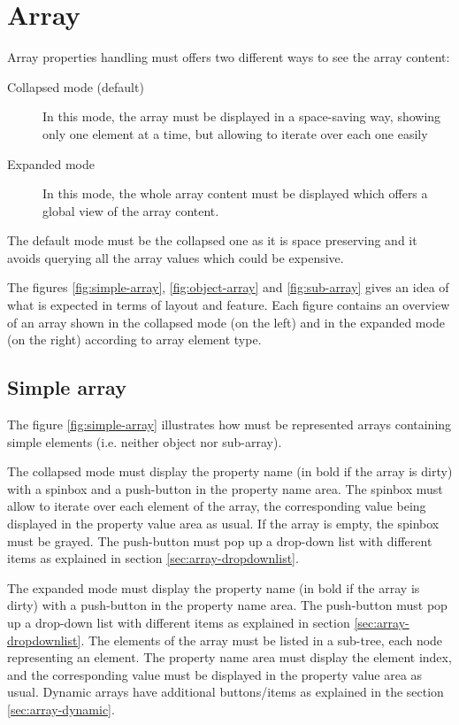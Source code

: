 \documentclass[a4paper, twoside]{report}
\begin{document}
\section{Array}

Array properties handling must offers two different ways to see the array content:
\begin{description}
    \item[Collapsed mode (default)] In this mode, the array must be displayed in a space-saving way,
showing only one element at a time, but allowing to iterate over each one easily
    \item[Expanded mode] In this mode, the whole array content must be displayed which offers a
global view of the array content.
\end{description}

The default mode must be the collapsed one as it is space preserving and it avoids querying all the
array values which could be expensive.

The figures \ref{fig:simple-array}, \ref{fig:object-array} and \ref{fig:sub-array} gives an idea of
what is expected in terms of layout and feature. Each figure contains an overview of an array shown
in the collapsed mode (on the left) and in the expanded mode (on the right) according to array
element type.

\subsection{Simple array\label{sec:array-simple}}

The figure \ref{fig:simple-array} illustrates how must be represented arrays containing simple
elements (i.e. neither object nor sub-array).

The collapsed mode must display the property name (in bold if the array is dirty) with a spinbox and
a push-button in the property name area. The spinbox must allow to iterate
over each element of the array, the corresponding value being displayed in the property value area
as usual. If the array is empty, the spinbox must be grayed. The push-button must pop up a
drop-down list with different items as explained in section \ref{sec:array-dropdownlist}.

The expanded mode must display the property name (in bold if the array is dirty) with a push-button
in the property name area. The push-button must pop up a drop-down list with different items as
explained in section \ref{sec:array-dropdownlist}. The elements of the array must be listed in a
sub-tree, each node representing an element. The property name area must display the element
index, and the corresponding value must be displayed in the property value area as usual. Dynamic
arrays have additional buttons/items as explained in the section \ref{sec:array-dynamic}.
\end{document}
